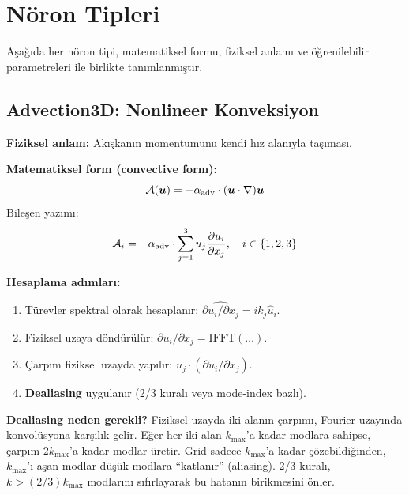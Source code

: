 \section{Nöron Tipleri}
\label{sec:noron_tipleri}

Aşağıda her nöron tipi, matematiksel formu, fiziksel anlamı ve öğrenilebilir parametreleri ile birlikte tanımlanmıştır.


\subsection{Advection3D: Nonlineer Konveksiyon}
\label{sec:advection_noron}

\textbf{Fiziksel anlam:} Akışkanın momentumunu kendi hız alanıyla taşıması.

\textbf{Matematiksel form (convective form):}
\begin{equation}
    \mathcal{A}(\bm{u}) = -\alpha_{\text{adv}} \cdot (\bm{u} \cdot \nabla)\bm{u}
    \label{eq:advection_neuron}
\end{equation}
Bileşen yazımı:
\begin{equation}
    \mathcal{A}_i = -\alpha_{\text{adv}} \cdot \sum_{j=1}^{3} u_j \frac{\partial u_i}{\partial x_j}, \quad i \in \{1, 2, 3\}
    \label{eq:advection_component}
\end{equation}

\textbf{Hesaplama adımları:}
\begin{enumerate}
    \item Türevler spektral olarak hesaplanır: $\widehat{\partial u_i / \partial x_j} = i k_j \hat{u}_i$.
    \item Fiziksel uzaya döndürülür: $\partial u_i / \partial x_j = \text{IFFT}(\ldots)$.
    \item Çarpım fiziksel uzayda yapılır: $u_j \cdot (\partial u_i / \partial x_j)$.
    \item \textbf{Dealiasing} uygulanır (2/3 kuralı veya mode-index bazlı).
\end{enumerate}

\textbf{Dealiasing neden gerekli?} Fiziksel uzayda iki alanın çarpımı, Fourier uzayında konvolüsyona karşılık gelir. Eğer her iki alan $k_{\max}$'a kadar modlara sahipse, çarpım $2k_{\max}$'a kadar modlar üretir. Grid sadece $k_{\max}$'a kadar çözebildiğinden, $k_{\max}$'ı aşan modlar düşük modlara ``katlanır'' (aliasing). 2/3 kuralı, $k > (2/3)k_{\max}$ modlarını sıfırlayarak bu hatanın birikmesini önler.

